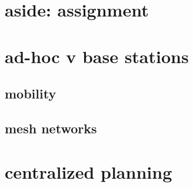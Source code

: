 
\section{aside: assignment}

\section{ad-hoc v base stations}


\subsection{mobility}


\subsection{mesh networks}


\section{centralized planning}


